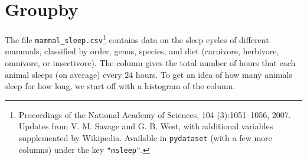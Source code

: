 




\section*{Groupby} %

The file \texttt{mammal\_sleep.csv}\footnote{Proceedings of the National Academy of Sciences, 104 (3):1051--1056, 2007.
Updates from V. M. Savage and G. B. West, with additional variables supplemented by Wikipedia.
Available in \texttt{pydataset} (with a few more columns) under the key \texttt{"msleep"}.} contains data on the sleep cycles of different mammals, classified by order, genus, species, and diet (carnivore, herbivore, omnivore, or insectivore).
The  column gives the total number of hours that each animal sleeps (on average) every $24$ hours.
To get an idea of how many animals sleep for how long, we start off with a histogram of the  column.

